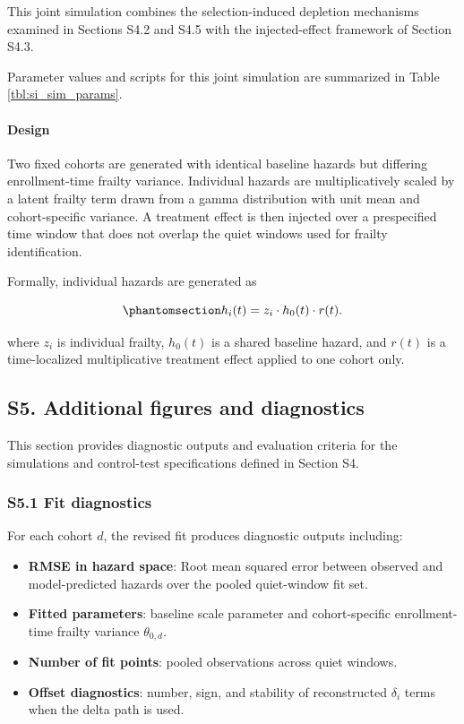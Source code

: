 \documentclass[
]{article}
\providecommand{\tightlist}{%
  \setlength{\itemsep}{0pt}\setlength{\parskip}{0pt}}
\begin{document}
This joint simulation combines the selection-induced depletion
mechanisms examined in Sections S4.2 and S4.5 with the injected-effect
framework of Section S4.3.

Parameter values and scripts for this joint simulation are summarized in
Table \ref{tbl:si_sim_params}.

\paragraph{Design}\label{design}

Two fixed cohorts are generated with identical baseline hazards but
differing enrollment-time frailty variance. Individual hazards are
multiplicatively scaled by a latent frailty term drawn from a gamma
distribution with unit mean and cohort-specific variance. A treatment
effect is then injected over a prespecified time window that does not
overlap the quiet windows used for frailty identification.

Formally, individual hazards are generated as

\begin{equation}\protect\phantomsection\label{eq:si_individual_hazard_with_effect}{
h_i(t) = z_i \cdot h_0(t) \cdot r(t).
}\end{equation}

where \(z_i\) is individual frailty, \(h_0(t)\) is a shared baseline
hazard, and \(r(t)\) is a time-localized multiplicative treatment effect
applied to one cohort only.

\subsection{S5. Additional figures and
diagnostics}\label{s5.-additional-figures-and-diagnostics}

This section provides diagnostic outputs and evaluation criteria for the
simulations and control-test specifications defined in Section S4.

\subsubsection{S5.1 Fit diagnostics}\label{s5.1-fit-diagnostics}

For each cohort \(d\), the revised fit produces diagnostic outputs
including:

\begin{itemize}
\tightlist
\item
  \textbf{RMSE in hazard space}: Root mean squared error between
  observed and model-predicted hazards over the pooled quiet-window fit
  set.
\item
  \textbf{Fitted parameters}: baseline scale parameter and
  cohort-specific enrollment-time frailty variance \(\theta_{0,d}\).
\item
  \textbf{Number of fit points}: pooled observations across quiet
  windows.
\item
  \textbf{Offset diagnostics}: number, sign, and stability of
  reconstructed \(\delta_i\) terms when the delta path is used.
\end{itemize}
\end{document}
